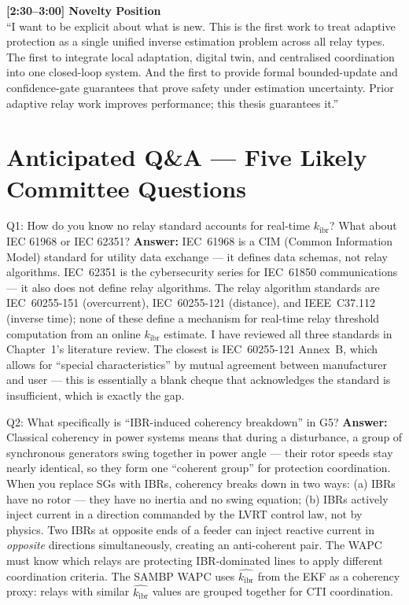 \documentclass[12pt,a4paper]{article}
\newcommand{\kibr}{k_\mathrm{ibr}}
\begin{document}
\begin{speakbox}
\medskip
\textbf{[2:30--3:00] Novelty Position}\\
``I want to be explicit about what is new.  This is the first work to treat
adaptive protection as a single unified inverse estimation problem across all
relay types.  The first to integrate local adaptation, digital twin, and
centralised coordination into one closed-loop system.  And the first to provide
formal bounded-update and confidence-gate guarantees that prove safety under
estimation uncertainty.  Prior adaptive relay work improves performance; this
thesis guarantees it.''
\end{speakbox}

\section{Anticipated Q\&A --- Five Likely Committee Questions}

\begin{keybox}{Q1: How do you know no relay standard accounts for real-time $\kibr$? What about IEC 61968 or IEC 62351?}
\textbf{Answer:}  IEC~61968 is a CIM (Common Information Model) standard for utility
data exchange --- it defines data schemas, not relay algorithms.  IEC~62351 is the
cybersecurity series for IEC~61850 communications --- it also does not define relay
algorithms.  The relay algorithm standards are IEC~60255-151 (overcurrent), IEC~60255-121
(distance), and IEEE~C37.112 (inverse time); none of these define a mechanism for
real-time relay threshold computation from an online $\kibr$ estimate.  I have reviewed
all three standards in Chapter~1's literature review.  The closest is IEC~60255-121
Annex~B, which allows for ``special characteristics'' by mutual agreement between
manufacturer and user --- this is essentially a blank cheque that acknowledges the
standard is insufficient, which is exactly the gap.
\end{keybox}

\begin{keybox}{Q2: What specifically is ``IBR-induced coherency breakdown'' in G5?}
\textbf{Answer:}  Classical coherency in power systems means that during a disturbance,
a group of synchronous generators swing together in power angle --- their rotor speeds
stay nearly identical, so they form one ``coherent group'' for protection coordination.
When you replace SGs with IBRs, coherency breaks down in two ways: (a) IBRs have no
rotor --- they have no inertia and no swing equation; (b) IBRs actively inject current
in a direction commanded by the LVRT control law, not by physics.  Two IBRs at
opposite ends of a feeder can inject reactive current in \emph{opposite} directions
simultaneously, creating an anti-coherent pair.  The WAPC must know which relays are
protecting IBR-dominated lines to apply different coordination criteria.  The SAMBP
WAPC uses $\hat{\kibr}$ from the EKF as a coherency proxy: relays with similar $\hat{\kibr}$
values are grouped together for CTI coordination.
\end{keybox}
\end{document}
